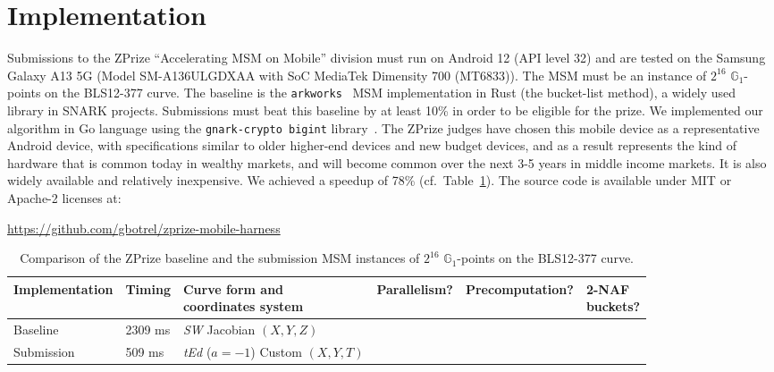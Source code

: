 \documentclass[journal=tches,spthm]{iacrtrans}
\newcommand{\ymark}{\ding{51}}%
\newcommand{\nmark}{\ding{55}}%
\newcommand{\G}{\ensuremath{\mathbb G}}
\begin{document}
\section{Implementation}
\label{sec:implementation}
Submissions to the ZPrize ``Accelerating MSM on Mobile'' division must
run on Android 12 (API level 32) and are tested on the Samsung Galaxy
A13 5G (Model SM-A136ULGDXAA with SoC MediaTek Dimensity 700
(MT6833)). The MSM must be an instance of $2^{16}$ $\G_1$-points on
the BLS12-377 curve. The baseline is the
\texttt{arkworks}~\cite{arkworks} MSM implementation in Rust (the
bucket-list method), a widely used library in SNARK projects. Submissions must beat this baseline by at least
10\% in order to be eligible for the prize.  We implemented our
algorithm in Go language using the \texttt{gnark-crypto bigint}
library~\cite{gnark-crypto}.  The ZPrize judges have chosen this
mobile device as a representative Android device, with specifications
similar to older higher-end devices and new budget devices, and as a
result represents the kind of hardware that is common today in wealthy
markets, and will become common over the next 3-5 years in middle
income markets. It is also widely available and relatively
inexpensive. We achieved a speedup of 78\%
(cf.~Table~\ref{tab:zprize}). The source code is available under MIT or Apache-2 licenses at:

\begin{center}
    \url{https://github.com/gbotrel/zprize-mobile-harness}
\end{center}

\begin{table}[htb]
\begin{center}
\begin{tabular}{l|l|l|l|l|l}
    Implementation & Timing & \makecell[l]{Curve form and \\ coordinates system} & Parallelism? & Precomputation? & \makecell[l]{2-NAF \\ buckets?} \\
    \hline
    Baseline & 2309 ms & \makecell[l]{\textit{SW} \\ Jacobian $(X,Y,Z)$} & \ymark & \nmark & \nmark \\
    \hline
    Submission & 509 ms & \makecell[l]{\textit{tEd} ($a=-1$) \\ Custom $(X,Y,T)$} & \ymark & \nmark & \ymark \\
\end{tabular}
\end{center}
\caption{Comparison of the ZPrize baseline and the submission MSM instances of $2^{16}$ $\G_1$-points on the BLS12-377 curve.}
\label{tab:zprize}
\end{table}
\end{document}
